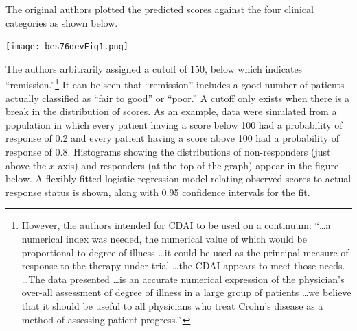 The original authors plotted the predicted scores against the four
clinical categories as shown below.

\centerline{\texttt{[image: bes76devFig1.png]}}

The authors arbitrarily assigned a cutoff of 150, below which
indicates ``remission.''\footnote{However, the authors intended for
  CDAI to be used on a continuum: ``\ldots a numerical index was
  needed, the numerical value of which would be proportional to degree
  of illness \ldots it could be used as the principal measure of
  response to the therapy under trial \ldots the CDAI appears to meet
  those needs. \ldots The data presented \ldots is an accurate
  numerical expression of the physician's over-all assessment of
  degree of illness in a large group of patients \ldots we believe
  that it should be useful to all physicians who treat Crohn's disease
  as a method of assessing patient progress.''.}  It can be seen that
``remission'' includes a
good number of patients actually classified as ``fair to good'' or
``poor.''  A cutoff only exists when there is a break in the
distribution of scores.  As an example, data were simulated from a
population in which every patient having a score below 100 had a
probability of response of 0.2 and every patient having a score above
100 had a probability of response of 0.8.  Histograms showing the
distributions of non-responders (just above the $x$-axis) and
responders (at the top of the graph) appear in the figure below.  A
flexibly fitted logistic regression model relating observed scores to
actual response status is shown, along with 0.95 confidence intervals
for the fit.

